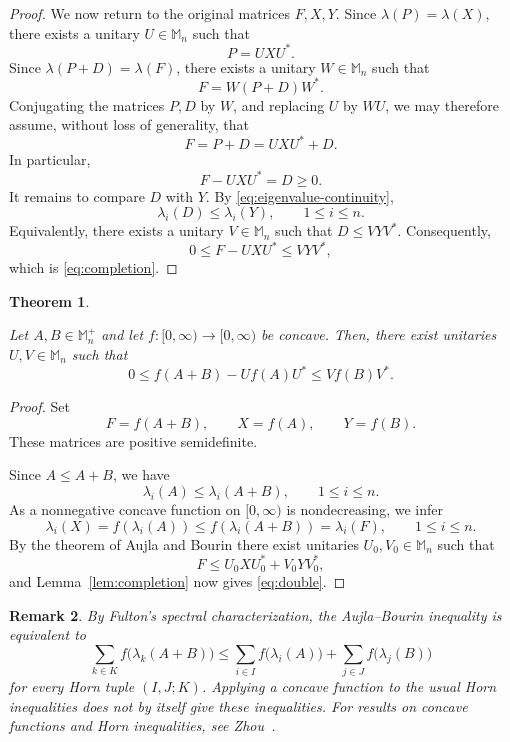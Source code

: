\documentclass[10pt,a4paper]{amsart}
\numberwithin{equation}{section}
\newtheorem{theorem}{Theorem}[section]
\newtheorem{remark}[theorem]{Remark}
\newcommand{\Mn}{\mathbb M_n}
\newcommand{\Mnp}{\mathbb M_n^+}
\begin{document}
\begin{proof}
We now return to the original matrices \(F,X,Y\). Since
\(\lambda(P)=\lambda(X)\), there exists a unitary \(U\in\Mn\) such that
\[
    P=UXU^*.
\]
Since \(\lambda(P+D)=\lambda(F)\), there exists a unitary
\(W\in\Mn\) such that
\[
    F=W(P+D)W^*.
\]
Conjugating the matrices \(P,D\) by \(W\), and replacing \(U\) by
\(WU\), we may therefore assume, without loss of generality, that
\[
    F=P+D=UXU^*+D.
\]
In particular,
\[
    F-UXU^*=D\geq0.
\]
It remains to compare \(D\) with \(Y\). By \eqref{eq:eigenvalue-continuity},
\[
    \lambda_i(D)\leq\lambda_i(Y),
    \qquad 1\leq i\leq n.
\]
Equivalently, there exists a unitary \(V\in\Mn\) such that
\(
    D\leq VYV^*.
\)
Consequently,
\[
    0\leq F-UXU^*\leq VYV^*,
\]
which is \eqref{eq:completion}.
\end{proof}


\begin{theorem}\label{thm:double}

Let \(A,B\in\Mnp\) and let
\(f:[0,\infty)\to[0,\infty)\) be concave. Then, there exist unitaries
\(U,V\in\Mn\) such that
\begin{equation}\label{eq:double}
    0\leq f(A+B)-Uf(A)U^*
    \leq Vf(B)V^*.
\end{equation}
\end{theorem}

\begin{proof}
Set
\[
    F=f(A+B),\qquad
    X=f(A),\qquad
    Y=f(B).
\]
These matrices are positive semidefinite.

Since \(A\leq A+B\), we have
\[
    \lambda_i(A)\leq\lambda_i(A+B),
    \qquad 1\leq i\leq n.
\]
As a nonnegative concave function on \([0,\infty)\) is
nondecreasing, we infer
\[
    \lambda_i(X)
    =f(\lambda_i(A))
    \leq f(\lambda_i(A+B))
    =\lambda_i(F),
    \qquad 1\leq i\leq n.
\]
By the theorem of Aujla and Bourin
there exist unitaries
\(U_0,V_0\in\Mn\) such that
\[
    F\leq U_0 X U_0^*+V_0 Y V_0^*,
\]
and Lemma~\ref{lem:completion} now gives
\eqref{eq:double}.
\end{proof}

\begin{remark}
\label{rem:functional-horn}
By Fulton's spectral characterization, the Aujla--Bourin
inequality is equivalent to
\[
\sum_{k\in K} f\bigl(\lambda_k(A+B)\bigr)
\leq
\sum_{i\in I} f\bigl(\lambda_i(A)\bigr)
+
\sum_{j\in J} f\bigl(\lambda_j(B)\bigr)
\]
for every Horn tuple $(I,J;K)$.
Applying a concave function to the usual Horn inequalities does
not by itself give these inequalities. For results on concave
functions and Horn inequalities, see Zhou~\cite{JZhou26}.
\end{remark}
\end{document}
